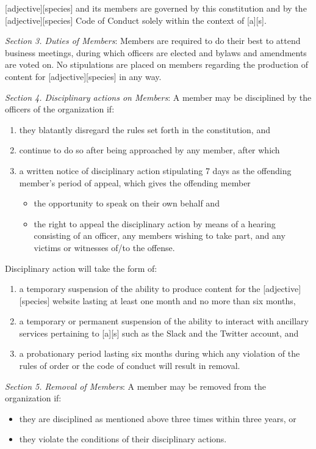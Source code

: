 \documentclass{article}
\begin{document}
[adjective][species] and its members are governed by this constitution and by the [adjective][species] Code of Conduct solely within the context of [a][s].

\emph{Section 3. Duties of Members}: Members are required to do their best to attend business meetings, during which officers are elected and bylaws and amendments are voted on.  No stipulations are placed on members regarding the production of content for [adjective][species] in any way.

\emph{Section 4. Disciplinary actions on Members}: A member may be disciplined by the officers of the organization if:
\begin{enumerate}
  \item they blatantly disregard the rules set forth in the constitution, and
  \item continue to do so after being approached by any member, after which
  \item a written notice of disciplinary action stipulating 7 days as the offending member's period of appeal, which gives the offending member
  \begin{itemize}
    \item the opportunity to speak on their own behalf and
    \item the right to appeal the disciplinary action by means of a hearing consisting of an officer, any members wishing to take part, and any victims or witnesses of/to the offense.
  \end{itemize}
\end{enumerate}

Disciplinary action will take the form of:
\begin{enumerate}
  \item a temporary suspension of the ability to produce content for the [adjective][species] website lasting at least one month and no more than six months,
  \item a temporary or permanent suspension of the ability to interact with ancillary services pertaining to [a][s] such as the Slack and the Twitter account, and
  \item a probationary period lasting six months during which any violation of the rules of order or the code of conduct will result in removal.
\end{enumerate}

\emph{Section 5. Removal of Members}: A member may be removed from the organization if:
\begin{itemize}
  \item they are disciplined as mentioned above three times within three years, or
  \item they violate the conditions of their disciplinary actions.
\end{itemize}
\end{document}
